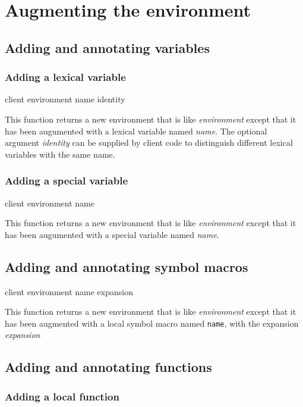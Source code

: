 \chapter{Augmenting the environment}

\section{Adding and annotating variables}

\subsection{Adding a lexical variable}

{\footnotesize
{} {client environment name \optional identity}
}

This function returns a new environment that is like
\textit{environment} except that it has been augumented with a lexical
variable named \textit{name}.  The optional argument \textit{identity}
can be supplied by client code to distinguish different lexical
variables with the same name.

\subsection{Adding a special variable}

{\footnotesize
{} {client environment name}
}

This function returns a new environment that is like
\textit{environment} except that it has been augumented with a special
variable named \textit{name}.

\section{Adding and annotating symbol macros}

{\footnotesize
{} {client environment name expansion}
}

This function returns a new environment that is like
\textit{environment} except that it has been augmented with a local
symbol macro named \texttt{name}, with the expansion
\textit{expansion}

\section{Adding and annotating functions}

\subsection{Adding a local function}

